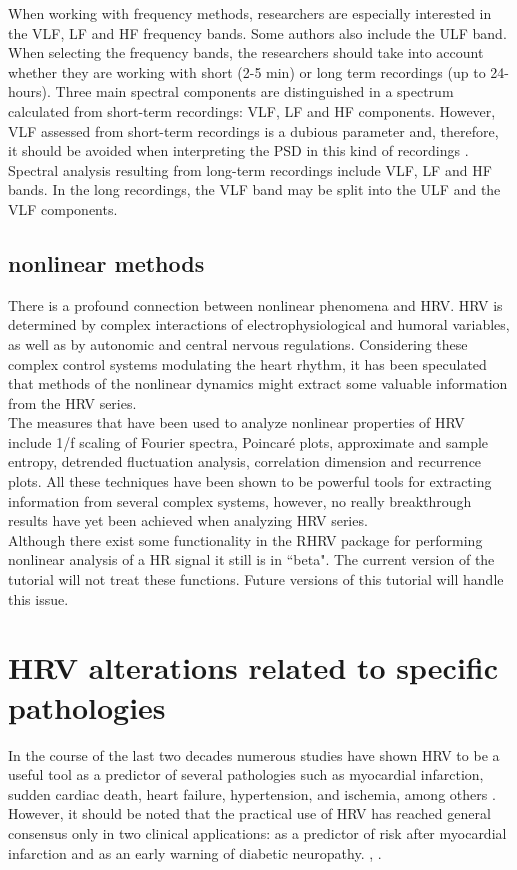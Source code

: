 \documentclass[12pt,lot, lof]{puthesis}
\begin{document}
When working with frequency methods, researchers are especially interested in 
the \gls{VLF}, \gls{LF} and \gls{HF} frequency bands. Some authors also include 
the \gls{ULF} band.
When selecting the frequency bands, the researchers should take into account 
whether they are working with short (2-5 min) or long term recordings (up to 
24-hours). Three main spectral components
are distinguished in a spectrum calculated from short-term recordings: 
\gls{VLF}, \gls{LF} and \gls{HF} components. However,  \gls{VLF} assessed from 
short-term recordings is 
a dubious  parameter and, therefore, it should be avoided when interpreting the 
\gls{PSD} in this kind of recordings \cite{forceHRV}. Spectral analysis 
resulting from long-term recordings include \gls{VLF}, \gls{LF} and \gls{HF} 
bands. In the long recordings, the \gls{VLF} band may be split into the 
\gls{ULF} and the \gls{VLF} components.\\

\subsection{nonlinear methods}
There is a profound connection between nonlinear phenomena and \gls{HRV}. 
\gls{HRV} is determined by complex interactions of electrophysiological and 
humoral variables, as well as by autonomic and central nervous regulations. 
Considering these complex control systems modulating the heart rhythm, it has 
been speculated that methods
of the nonlinear dynamics might extract some valuable information
from the \gls{HRV} series.\\

The measures that have been used to analyze nonlinear properties of \gls{HRV} 
include 1/f scaling of Fourier spectra, Poincar\'{e} plots, approximate and 
sample entropy, detrended fluctuation analysis, correlation dimension and 
recurrence plots. All these techniques have been shown to be powerful tools for 
extracting information from several complex systems, however, no really 
breakthrough results have yet been achieved when analyzing \gls{HRV} series.\\

Although there exist some functionality in the RHRV package for performing 
nonlinear analysis of a \gls{HR} signal it still is in ``beta". The current 
version of the tutorial will not treat these functions. Future versions of this 
tutorial will handle this issue.

\section{HRV alterations related to specific pathologies\label{sec:pathologies}}
In the course of the last two decades numerous studies have shown \gls{HRV} to 
be
a useful tool as a predictor of several pathologies such as myocardial 
infarction, sudden
cardiac death, heart failure, hypertension, and ischemia, among others 
\cite{malik1995}. 
However, it should be noted that the practical use of \gls{HRV} has reached
general consensus only in two clinical applications: as a predictor
of risk after myocardial infarction and as an early warning of diabetic 
neuropathy. \cite{forceHRV}, \cite{kautzner1997}.\\
\end{document}
